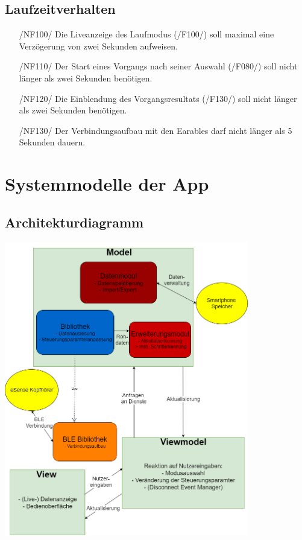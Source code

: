 \documentclass[a4paper,12pt]{article}
\begin{document}
\subsection{Laufzeitverhalten}
\begin{itemize}
  \item[/NF100/] Die Liveanzeige des Laufmodus (/F100/) soll maximal eine Verzögerung von zwei Sekunden aufweisen. 
  \item[/NF110/] Der Start eines Vorgangs nach seiner Auswahl (/F080/) soll nicht länger als zwei Sekunden benötigen. 
  \item[/NF120/] Die Einblendung des Vorgangsresultats (/F130/) soll nicht länger als zwei Sekunden benötigen.
  \item[/NF130/] Der Verbindungsaufbau mit den \Gls{Earables} darf nicht länger als 5 Sekunden dauern.

\end{itemize}
\section{Systemmodelle der App}
  \subsection{Architekturdiagramm}
  \begin{center}
  	\vspace{100px}
  	\includegraphics[width=0.8\textwidth]{./Diagramme/Achi5.png}
  \end{center}
  \clearpage %
\end{document}
